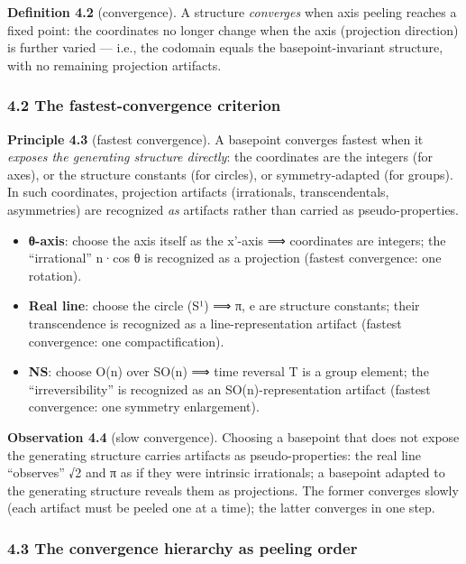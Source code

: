 \documentclass[
]{article}
\providecommand{\tightlist}{%
  \setlength{\itemsep}{0pt}\setlength{\parskip}{0pt}}
\begin{document}
\textbf{Definition 4.2} (convergence). A structure \emph{converges} when
axis peeling reaches a fixed point: the coordinates no longer change
when the axis (projection direction) is further varied --- i.e., the
codomain equals the basepoint-invariant structure, with no remaining
projection artifacts.

\subsubsection{4.2 The fastest-convergence
criterion}\label{the-fastest-convergence-criterion}

\textbf{Principle 4.3} (fastest convergence). A basepoint converges
fastest when it \emph{exposes the generating structure directly}: the
coordinates are the integers (for axes), or the structure constants (for
circles), or symmetry-adapted (for groups). In such coordinates,
projection artifacts (irrationals, transcendentals, asymmetries) are
recognized \emph{as} artifacts rather than carried as pseudo-properties.

\begin{itemize}
\tightlist
\item
  \textbf{θ-axis}: choose the axis itself as the x'-axis ⟹ coordinates
  are integers; the ``irrational'' n·cos θ is recognized as a projection
  (fastest convergence: one rotation).
\item
  \textbf{Real line}: choose the circle (S¹) ⟹ π, e are structure
  constants; their transcendence is recognized as a line-representation
  artifact (fastest convergence: one compactification).
\item
  \textbf{NS}: choose O(n) over SO(n) ⟹ time reversal T is a group
  element; the ``irreversibility'' is recognized as an
  SO(n)-representation artifact (fastest convergence: one symmetry
  enlargement).
\end{itemize}

\textbf{Observation 4.4} (slow convergence). Choosing a basepoint that
does not expose the generating structure carries artifacts as
pseudo-properties: the real line ``observes'' √2 and π as if they were
intrinsic irrationals; a basepoint adapted to the generating structure
reveals them as projections. The former converges slowly (each artifact
must be peeled one at a time); the latter converges in one step.

\subsubsection{4.3 The convergence hierarchy as peeling
order}\label{the-convergence-hierarchy-as-peeling-order}
\end{document}
